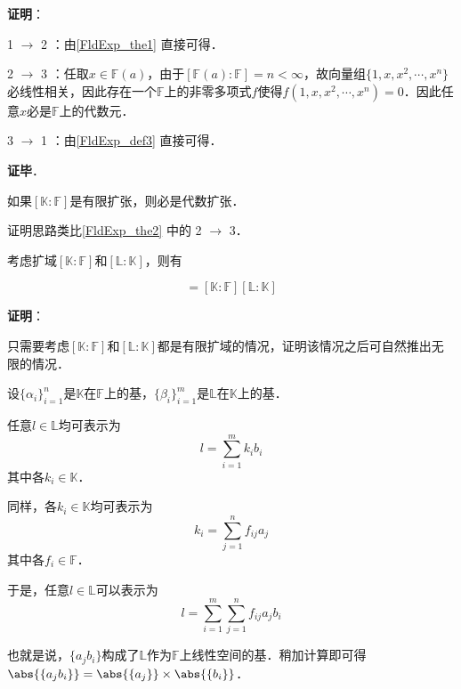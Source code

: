\textbf{证明}：

1 $\to$ 2 ：由\autoref{FldExp_the1} 直接可得．

2 $\to$ 3 ：任取$x\in\mathbb{F}(a)$，由于$[\mathbb{F}(a):\mathbb{F}]=n<\infty$，故向量组$\{1, x, x^2, \cdots, x^n\}$必线性相关，因此存在一个$\mathbb{F}$上的非零多项式$f$使得$f(1, x, x^2, \cdots, x^n)=0$．因此任意$x$必是$\mathbb{F}$上的代数元．

3 $\to$ 1 ：由\autoref{FldExp_def3} 直接可得．

\textbf{证毕}．

\begin{corollary}{}
如果$[\mathbb{K}:\mathbb{F}]$是有限扩张，则必是代数扩张．
\end{corollary}

证明思路类比\autoref{FldExp_the2} 中的 2 $\to$ 3．





\begin{theorem}{}\label{FldExp_the3}
考虑扩域$[\mathbb{K}:\mathbb{F}]$和$[\mathbb{L}:\mathbb{K}]$，则有

\begin{equation}
[\mathbb{L}:\mathbb{F}]=[\mathbb{K}:\mathbb{F}][\mathbb{L}:\mathbb{K}]
\end{equation}

\end{theorem}

\textbf{证明}：

只需要考虑$[\mathbb{K}:\mathbb{F}]$和$[\mathbb{L}:\mathbb{K}]$都是有限扩域的情况，证明该情况之后可自然推出无限的情况．

设$\{\alpha_i\}_{i=1}^{n}$是$\mathbb{K}$在$\mathbb{F}$上的基，$\{\beta_i\}_{i=1}^{m}$是$\mathbb{L}$在$\mathbb{K}$上的基．

任意$l\in\mathbb{L}$均可表示为
\begin{equation}
l = \sum_{i=1}^m k_ib_i
\end{equation}
其中各$k_i\in\mathbb{K}$．

同样，各$k_i\in\mathbb{K}$均可表示为
\begin{equation}
k_i = \sum_{j=1}^n f_{ij}a_j
\end{equation}
其中各$f_i\in\mathbb{F}$．

于是，任意$l\in\mathbb{L}$可以表示为
\begin{equation}
l = \sum_{i=1}^m \sum_{j=1}^n f_{ij}a_jb_i
\end{equation}

也就是说，$\{a_jb_i\}$构成了$\mathbb{L}$作为$\mathbb{F}$上线性空间的基．稍加计算即可得$\abs{\{a_jb_i\}}=\abs{\{a_j\}}\times\abs{\{b_i\}}$．





